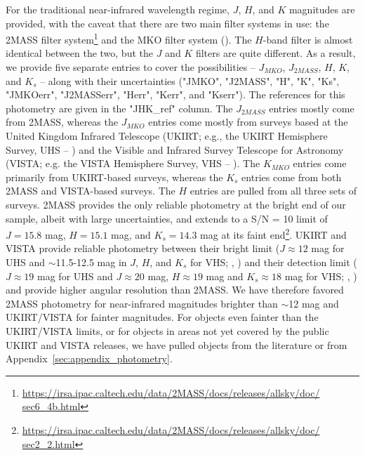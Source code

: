 \documentclass[twocolumn,tighten,twocolappendix]{aastex631}
\begin{document}
For the traditional near-infrared wavelength regime, $J$, $H$, and $K$ magnitudes are provided, with the caveat that there are two main filter systems in use: the 2MASS filter system\footnote{\url {https://irsa.ipac.caltech.edu/data/2MASS/docs/releases/allsky/doc/ sec6\_4b.html}} and the MKO filter system (\citealt{tokunaga2002}). The $H$-band filter is almost identical between the two, but the $J$ and $K$ filters are quite different. As a result, we provide five separate entries to cover the possibilities -- $J_{MKO}$, $J_{2MASS}$, $H$, $K$, and $K_s$ -- along with their uncertainties ("JMKO", "J2MASS", "H", "K", "Ks", "JMKOerr", "J2MASSerr", "Herr", "Kerr", and "Kserr"). The references for this photometry are given in the "JHK\_ref" column. The  $J_{2MASS}$ entries mostly come from 2MASS, whereas the $J_{MKO}$ entries come mostly from surveys based at the United Kingdom Infrared Telescope (UKIRT; e.g., the UKIRT Hemisphere Survey, UHS -- \citealt{mcmahon2013}) and the Visible and Infrared Survey Telescope for Astronomy (VISTA; e.g. the VISTA Hemisphere Survey, VHS --  \citealt{dye2018}). The $K_{MKO}$ entries come primarily from UKIRT-based surveys, whereas the $K_s$ entries come from both 2MASS and VISTA-based surveys. The $H$ entries are pulled from all three sets of surveys.  2MASS provides the only reliable photometry at the bright end of our sample, albeit with large uncertainties, and extends to a S/N = 10 limit of $J = 15.8$ mag, $H = 15.1$ mag, and $K_s = 14.3$ mag at its faint end\footnote{\url {https://irsa.ipac.caltech.edu/data/2MASS/docs/releases/allsky/doc/ sec2\_2.html}}. UKIRT and VISTA provide reliable photometry between their bright limit ($J \approx 12$ mag for UHS and $\sim$11.5-12.5 mag in $J$, $H$, and $K_s$ for VHS; \citealt{dye2018}, \citealt{gonzalez-fernandez2018}) and their detection limit ($J \approx 19$ mag for UHS and $J \approx 20$ mag, $H \approx 19$ mag and $K_s \approx 18$ mag for VHS; \citealt{dye2018}, \citealt{gonzalez-fernandez2018}) and provide higher angular resolution than 2MASS. We have therefore favored 2MASS photometry for near-infrared magnitudes brighter than $\sim$12 mag and UKIRT/VISTA for fainter magnitudes. For objects even fainter than the UKIRT/VISTA limits, or for objects in areas not yet covered by the public UKIRT and VISTA releases, we have pulled objects from the literature or from Appendix~\ref{sec:appendix_photometry}.
\end{document}
